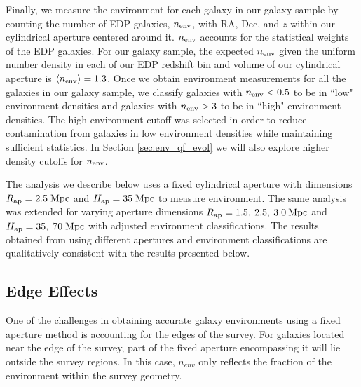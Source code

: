 \documentclass{emulateapj}
\def \apradius{2.5}
\def \apheight{35}
\begin{document}
Finally, we measure the environment for each galaxy in our galaxy
sample by counting the number of EDP galaxies, $n_{\rm{env}}$, with RA,
Dec, and $z$ within our cylindrical aperture centered around
it. $n_{\rm{env}}$ accounts for the statistical weights of the EDP
galaxies. 
For our galaxy sample, the expected $n_{\rm{env}}$ given the uniform number density in 
each of our EDP redshift bin and volume of our cylindrical aperture is $\langle n_{\rm{env}} \rangle = 1.3$. 
Once we obtain environment measurements for all the galaxies
in our galaxy sample, we classify galaxies with $n_{\rm{env}} < 0.5$
to be in ``low" environment densities and galaxies with $n_{\rm{env}} > 3$
to be in ``high" environment densities. The high environment cutoff was
selected in order to reduce contamination from galaxies in low
environment densities while maintaining sufficient statistics. In
Section \ref{sec:env_qf_evol} we will also explore higher density
cutoffs for $n_{\rm{env}}$.

The analysis we describe below uses a fixed cylindrical aperture with
dimensions $R_{\rm{ap}} = \apradius \; \rm{Mpc}$ and $H_{\rm{ap}} = \apheight
\;\rm{Mpc}$ to measure environment. The same analysis was
extended for varying aperture dimensions $R_{\rm{ap}} = 1.5, \: \apradius, \:3.0 \:
\rm{Mpc}$ and $H_{\rm{ap}} = \apheight, \; 70 \;\rm{Mpc}$ with adjusted environment classifications. 
The results obtained from using different apertures and
environment classifications are qualitatively consistent with the results presented below.  

\subsection{Edge Effects} \label{sec:edgeeffect}
One of the challenges in obtaining accurate galaxy environments using a fixed aperture method is accounting for the edges of the survey. For galaxies located near the edge of the survey, part of the fixed aperture encompassing it will lie outside the survey regions. In this case, $n_{env}$ only reflects the fraction of the environment within the survey geometry.
\end{document}
